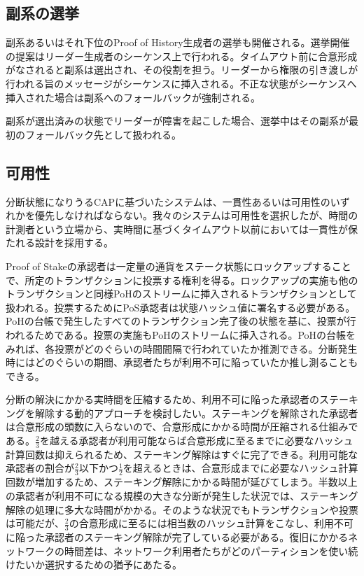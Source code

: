 \documentclass[12pt]{ltjsarticle}
\begin{document}
\subsection{副系の選挙}
副系あるいはそれ下位のProof of History生成者の選挙も開催される。選挙開催の提案はリーダー生成者のシーケンス上で行われる。タイムアウト前に合意形成がなされると副系は選出され、その役割を担う。リーダーから権限の引き渡しが行われる旨のメッセージがシーケンスに挿入される。不正な状態がシーケンスへ挿入された場合は副系へのフォールバックが強制される。

副系が選出済みの状態でリーダーが障害を起こした場合、選挙中はその副系が最初のフォールバック先として扱われる。

\subsection{可用性}\label{availability}
分断状態になりうるCAPに基づいたシステムは、一貫性あるいは可用性のいずれかを優先しなければならない。我々のシステムは可用性を選択したが、時間の計測者という立場から、実時間に基づくタイムアウト以前においては一貫性が保たれる設計を採用する。

Proof of Stakeの承認者は一定量の通貨をステーク状態にロックアップすることで、所定のトランザクションに投票する権利を得る。ロックアップの実施も他のトランザクションと同様PoHのストリームに挿入されるトランザクションとして扱われる。投票するためにPoS承認者は状態ハッシュ値に署名する必要がある。PoHの台帳で発生したすべてのトランザクション完了後の状態を基に、投票が行われるためである。投票の実施もPoHのストリームに挿入される。PoHの台帳をみれば、各投票がどのぐらいの時間間隔で行われていたか推測できる。分断発生時にはどのぐらいの期間、承認者たちが利用不可に陥っていたか推し測ることもできる。

分断の解決にかかる実時間を圧縮するため、利用不可に陥った承認者のステーキングを解除する動的アプローチを検討したい。ステーキングを解除された承認者は合意形成の頭数に入らないので、合意形成にかかる時間が圧縮される仕組みである。\(\frac{2}{3}\)を越える承認者が利用可能ならば合意形成に至るまでに必要なハッシュ計算回数は抑えられるため、ステーキング解除はすぐに完了できる。利用可能な承認者の割合が\(\frac{2}{3}\)以下かつ\(\frac{1}{2}\)を超えるときは、合意形成までに必要なハッシュ計算回数が増加するため、ステーキング解除にかかる時間が延びてしまう。半数以上の承認者が利用不可になる規模の大きな分断が発生した状況では、ステーキング解除の処理に多大な時間がかかる。そのような状況でもトランザクションや投票は可能だが、\(\frac{2}{3}\)の合意形成に至るには相当数のハッシュ計算をこなし、利用不可に陥った承認者のステーキング解除が完了している必要がある。復旧にかかるネットワークの時間差は、ネットワーク利用者たちがどのパーティションを使い続けたいか選択するための猶予にあたる。
\end{document}
